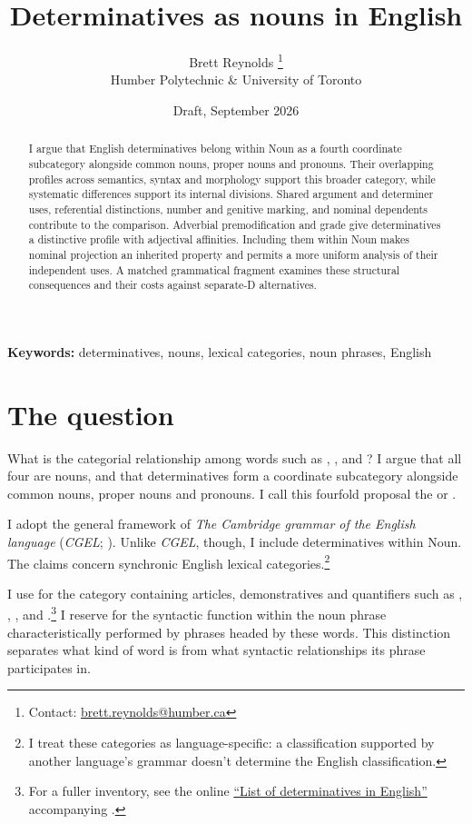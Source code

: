 \documentclass[12pt]{article}
\title{Determinatives as nouns in English}
\author{Brett Reynolds \orcidlink{0000-0003-0073-7195}%
\thanks{Contact: \href{mailto:brett.reynolds@humber.ca}{brett.reynolds@humber.ca}}\\
Humber Polytechnic \& University of Toronto}
\date{Draft, September 2026}
\begin{document}
\maketitle

\begin{abstract}
I argue that English determinatives belong within Noun as a fourth coordinate subcategory alongside common nouns, proper nouns and pronouns. Their overlapping profiles across semantics, syntax and morphology support this broader category, while systematic differences support its internal divisions. Shared argument and determiner uses, referential distinctions, number and genitive marking, and nominal dependents contribute to the comparison. Adverbial premodification and grade give determinatives a distinctive profile with adjectival affinities. Including them within Noun makes nominal projection an inherited property and permits a more uniform analysis of their independent uses. A matched grammatical fragment examines these structural consequences and their costs against separate-D alternatives.
\end{abstract}

\noindent\textbf{Keywords:} determinatives, nouns, lexical categories, noun phrases, English

\section{The question}\label{sec:intro}

What is the categorial relationship among words such as , ,  and ? I argue that all four are nouns, and that determinatives form a coordinate subcategory alongside common nouns, proper nouns and pronouns. I call this fourfold proposal the  or .

I adopt the general framework of \textit{The Cambridge grammar of the English language} (\textit{CGEL}; \citealt{huddleston2002}). Unlike \textit{CGEL}, though, I include determinatives within Noun. The claims concern synchronic English lexical categories.\footnote{I treat these categories as language-specific: a classification supported by another language's grammar doesn't determine the English classification.}

I use  for the category containing articles, demonstratives and quantifiers such as , , ,  and .\footnote{For a fuller inventory, see the online \href{https://www.cambridge.org/highereducation/api/resources/2AC8DF5CA558F8A6FCDFACD0EAF8EA08}{\enquote{List of determinatives in English}} accompanying \textcite{Huddleston2021}.} I reserve  for the syntactic function within the noun phrase characteristically performed by phrases headed by these words. This distinction separates what kind of word  is from what syntactic relationships its phrase participates in.
\end{document}
